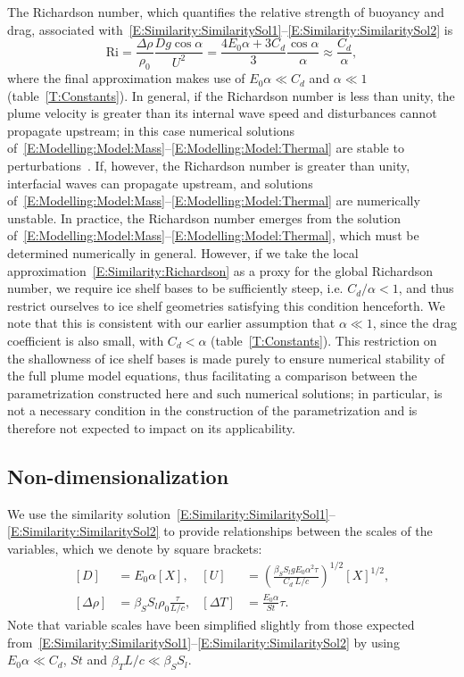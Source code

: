 \documentclass[openacc]{rsproca_new}%
\newcommand{\blue}[1]{{\color{blue} #1}}
\begin{document}
The Richardson number, which quantifies the relative strength of buoyancy and drag, associated with~\eqref{E:Similarity:SimilaritySol1}--\eqref{E:Similarity:SimilaritySol2} is
\begin{equation}\label{E:Similarity:Richardson}
\mathrm{Ri} = \frac{\Delta \rho}{\rho_0}\frac{D g \cos \alpha}{U^2} = \frac{4E_0 \alpha + 3C_d}{3} \frac{\cos \alpha}{\alpha} \approx \frac{C_d}{\alpha},
\end{equation}
where the final approximation makes use of $E_0 \alpha \ll C_d$ and $\alpha \ll 1$ (table~\ref{T:Constants}). In general, if the Richardson number is less than unity, the plume velocity is greater than its internal wave speed and disturbances cannot propagate upstream; in this case numerical solutions of~\eqref{E:Modelling:Model:Mass}--\eqref{E:Modelling:Model:Thermal} are stable to perturbations~\cite{Jenkinsphdthesis}. If, however, the Richardson number is greater than unity, interfacial waves can propagate upstream, and solutions of~\eqref{E:Modelling:Model:Mass}--\eqref{E:Modelling:Model:Thermal} are numerically unstable. In practice, the Richardson number emerges from the solution of~\eqref{E:Modelling:Model:Mass}--\eqref{E:Modelling:Model:Thermal}, which must be determined numerically in general. However, if we take the local approximation~\eqref{E:Similarity:Richardson} as a proxy for the global Richardson number, we require ice shelf bases to be sufficiently steep, i.e. $C_d/\alpha < 1$, and thus restrict ourselves to ice shelf geometries satisfying this condition henceforth. \blue{We note that this is consistent with our earlier assumption that $\alpha \ll 1$, since the drag coefficient is also small, with $C_d < \alpha$ (table~\ref{T:Constants}). This restriction on the shallowness of ice shelf bases is made purely to ensure numerical stability of the full plume model equations, thus facilitating a comparison between the parametrization constructed here and such numerical solutions; in particular, is not a necessary condition in the construction of the parametrization and is therefore not expected to impact on its applicability.}

\subsection{Non-dimensionalization}\label{S:Model:NonDim}
We use the similarity solution~\eqref{E:Similarity:SimilaritySol1}--\eqref{E:Similarity:SimilaritySol2} to provide relationships between the scales of the variables, which we denote by square brackets:
\begin{align}
\left[D\right] &= E_0 \alpha \left[X\right], & \left[U\right] &= \left(\frac{\beta_S S_l g E_0 \alpha^2 \tau}{C_d ~L/c}\right)^{1/2}[X]^{1/2},\label{E:Similarity:Scales1}\\
\left[\Delta \rho\right] &= \beta_S S_l \rho_0 \frac{\tau}{L/c}, & \left[\Delta T\right] &= \frac{E_0 \alpha}{St}\tau.\label{E:Similarity:Scales2}
\end{align}
Note that variable scales have been simplified slightly from those expected from~\eqref{E:Similarity:SimilaritySol1}--\eqref{E:Similarity:SimilaritySol2} by using $E_0 \alpha \ll C_d$, $St$ and $\beta_T L /c \ll \beta_S S_l$.
\end{document}
